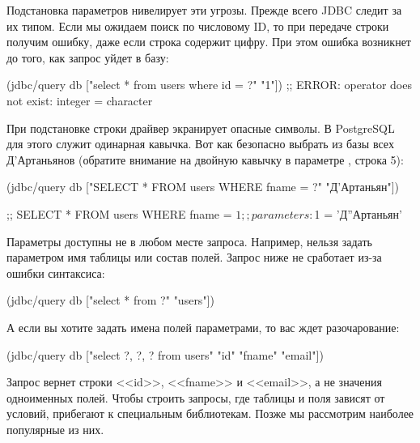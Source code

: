 Подстановка параметров нивелирует эти угрозы. Прежде всего JDBC следит за их типом. Если мы ожидаем поиск по числовому ID, то при передаче строки получим ошибку, даже если строка содержит цифру. При этом ошибка возникнет до того, как запрос уйдет в базу:

\begin{english}
  \begin{clojure}
(jdbc/query db ["select * from users where id = ?" "1"])
;; ERROR: operator does not exist: integer = character
  \end{clojure}
\end{english}

При подстановке строки драйвер экранирует опасные символы. В PostgreSQL для этого служит одинарная кавычка. Вот как безопасно выбрать из базы всех Д'Артаньянов (обратите внимание на двойную кавычку в параметре , строка 5):

  \begin{clojure/lines}
(jdbc/query db
  ["SELECT * FROM users WHERE fname = ?" "Д'Артаньян"])

;; SELECT * FROM users WHERE fname = $1
;; parameters: $1 = 'Д''Артаньян'
  \end{clojure/lines}

Параметры доступны не в любом месте запроса. Например, нельзя задать параметром имя таблицы или состав полей. Запрос ниже не сработает из-за ошибки синтаксиса:

\begin{english}
  \begin{clojure}
(jdbc/query db ["select * from ?" "users"])
  \end{clojure}
\end{english}

А если вы хотите задать имена полей параметрами, то вас ждет разочарование:

\begin{english}
  \begin{clojure}
(jdbc/query db
  ["select ?, ?, ? from users" "id" "fname" "email"])
  \end{clojure}
\end{english}

Запрос вернет строки <<id>>, <<fname>> и <<email>>, а не значения одноименных полей. Чтобы строить запросы, где таблицы и поля зависят от условий, прибегают к специальным библиотекам. Позже мы рассмотрим наиболее популярные из них.

